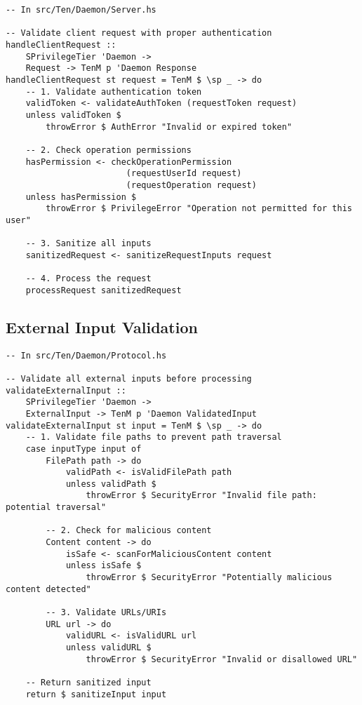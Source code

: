 \documentclass{article}
\begin{document}
\begin{tcolorbox}[title=Process Communication Boundaries]
\begin{verbatim}
-- In src/Ten/Daemon/Server.hs

-- Validate client request with proper authentication
handleClientRequest ::
    SPrivilegeTier 'Daemon ->
    Request -> TenM p 'Daemon Response
handleClientRequest st request = TenM $ \sp _ -> do
    -- 1. Validate authentication token
    validToken <- validateAuthToken (requestToken request)
    unless validToken $
        throwError $ AuthError "Invalid or expired token"

    -- 2. Check operation permissions
    hasPermission <- checkOperationPermission
                        (requestUserId request)
                        (requestOperation request)
    unless hasPermission $
        throwError $ PrivilegeError "Operation not permitted for this user"

    -- 3. Sanitize all inputs
    sanitizedRequest <- sanitizeRequestInputs request

    -- 4. Process the request
    processRequest sanitizedRequest
\end{verbatim}
\end{tcolorbox}

\subsection{External Input Validation}

\begin{tcolorbox}[title=External Input Validation]
\begin{verbatim}
-- In src/Ten/Daemon/Protocol.hs

-- Validate all external inputs before processing
validateExternalInput ::
    SPrivilegeTier 'Daemon ->
    ExternalInput -> TenM p 'Daemon ValidatedInput
validateExternalInput st input = TenM $ \sp _ -> do
    -- 1. Validate file paths to prevent path traversal
    case inputType input of
        FilePath path -> do
            validPath <- isValidFilePath path
            unless validPath $
                throwError $ SecurityError "Invalid file path: potential traversal"

        -- 2. Check for malicious content
        Content content -> do
            isSafe <- scanForMaliciousContent content
            unless isSafe $
                throwError $ SecurityError "Potentially malicious content detected"

        -- 3. Validate URLs/URIs
        URL url -> do
            validURL <- isValidURL url
            unless validURL $
                throwError $ SecurityError "Invalid or disallowed URL"

    -- Return sanitized input
    return $ sanitizeInput input
\end{verbatim}
\end{tcolorbox}
\end{document}
